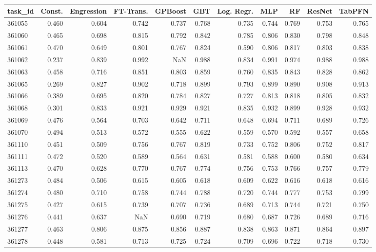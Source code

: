 \begin{tabular}{lrrrrrrrrrr}
\toprule
task\_id & Const. & Engression & FT-Trans. & GPBoost & GBT & Log. Regr. & MLP & RF & ResNet & TabPFN \\
\midrule
361055 & 0.460 & 0.604 & 0.742 & 0.737 & 0.768 & 0.735 & 0.744 & 0.769 & 0.753 & 0.765 \\
361060 & 0.465 & 0.698 & 0.815 & 0.792 & 0.842 & 0.785 & 0.806 & 0.830 & 0.798 & 0.848 \\
361061 & 0.470 & 0.649 & 0.801 & 0.767 & 0.824 & 0.590 & 0.806 & 0.817 & 0.803 & 0.838 \\
361062 & 0.237 & 0.839 & 0.992 & NaN & 0.988 & 0.834 & 0.991 & 0.974 & 0.988 & 0.988 \\
361063 & 0.458 & 0.716 & 0.851 & 0.803 & 0.859 & 0.760 & 0.835 & 0.843 & 0.828 & 0.862 \\
361065 & 0.269 & 0.827 & 0.902 & 0.718 & 0.899 & 0.793 & 0.899 & 0.890 & 0.908 & 0.913 \\
361066 & 0.389 & 0.695 & 0.820 & 0.784 & 0.827 & 0.727 & 0.813 & 0.818 & 0.805 & 0.832 \\
361068 & 0.301 & 0.833 & 0.921 & 0.929 & 0.921 & 0.835 & 0.932 & 0.899 & 0.928 & 0.932 \\
361069 & 0.476 & 0.564 & 0.703 & 0.642 & 0.711 & 0.648 & 0.694 & 0.711 & 0.689 & 0.726 \\
361070 & 0.494 & 0.513 & 0.572 & 0.555 & 0.622 & 0.559 & 0.570 & 0.592 & 0.557 & 0.658 \\
361110 & 0.451 & 0.509 & 0.756 & 0.767 & 0.819 & 0.733 & 0.752 & 0.806 & 0.752 & 0.817 \\
361111 & 0.472 & 0.520 & 0.589 & 0.564 & 0.631 & 0.581 & 0.588 & 0.600 & 0.580 & 0.634 \\
361113 & 0.470 & 0.628 & 0.770 & 0.767 & 0.774 & 0.756 & 0.753 & 0.766 & 0.757 & 0.779 \\
361273 & 0.484 & 0.506 & 0.615 & 0.605 & 0.618 & 0.609 & 0.622 & 0.616 & 0.618 & 0.616 \\
361274 & 0.480 & 0.710 & 0.758 & 0.744 & 0.788 & 0.720 & 0.744 & 0.777 & 0.753 & 0.799 \\
361275 & 0.427 & 0.615 & 0.739 & 0.707 & 0.736 & 0.689 & 0.713 & 0.744 & 0.721 & 0.750 \\
361276 & 0.441 & 0.637 & NaN & 0.690 & 0.719 & 0.680 & 0.687 & 0.726 & 0.689 & 0.716 \\
361277 & 0.463 & 0.806 & 0.875 & 0.856 & 0.887 & 0.838 & 0.863 & 0.871 & 0.864 & 0.897 \\
361278 & 0.448 & 0.581 & 0.713 & 0.725 & 0.724 & 0.709 & 0.696 & 0.722 & 0.718 & 0.730 \\

\end{tabular}

